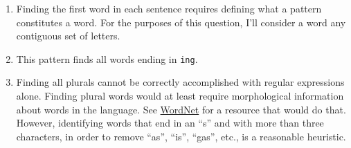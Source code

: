 \documentclass[]{book}
\newenvironment{Shaded}{\begin{snugshade}}{\end{snugshade}}
\newcommand{\CharTok}[1]{\textcolor[rgb]{0.31,0.60,0.02}{#1}}
\newcommand{\CommentTok}[1]{\textcolor[rgb]{0.56,0.35,0.01}{\textit{#1}}}
\newcommand{\KeywordTok}[1]{\textcolor[rgb]{0.13,0.29,0.53}{\textbf{#1}}}
\newcommand{\NormalTok}[1]{#1}
\newcommand{\OperatorTok}[1]{\textcolor[rgb]{0.81,0.36,0.00}{\textbf{#1}}}
\newcommand{\StringTok}[1]{\textcolor[rgb]{0.31,0.60,0.02}{#1}}
\theoremstyle{plain}
\theoremstyle{remark}
\begin{document}
\begin{enumerate}
\def\labelenumi{\arabic{enumi}.}
\item
  Finding the first word in each sentence requires defining what a
  pattern constitutes a word. For the purposes of this question, I'll
  consider a word any contiguous set of letters.

\begin{Shaded}
\end{Shaded}
\item
  This pattern finds all words ending in \texttt{ing}.

\begin{Shaded}
\end{Shaded}
\item
  Finding all plurals cannot be correctly accomplished with regular
  expressions alone. Finding plural words would at least require
  morphological information about words in the language. See
  \href{https://cran.r-project.org/web/packages/wordnet/index.html}{WordNet}
  for a resource that would do that. However, identifying words that end
  in an ``s'' and with more than three characters, in order to remove
  ``as'', ``is'', ``gas'', etc., is a reasonable heuristic.

\begin{Shaded}
\end{Shaded}
\end{enumerate}
\end{document}
